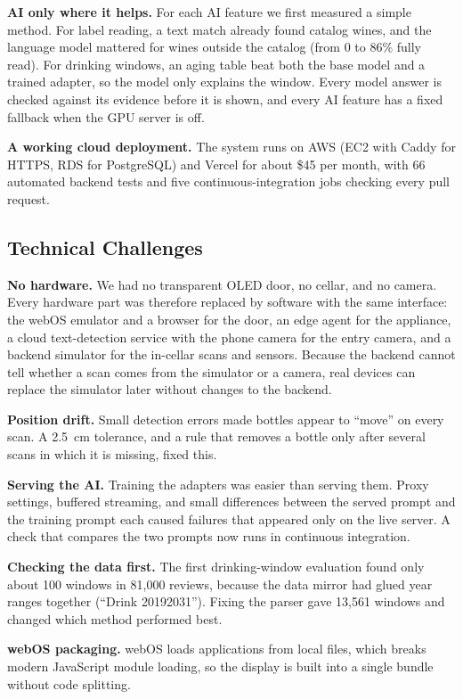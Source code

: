 \documentclass[conference]{IEEEtran}
\begin{document}
\textbf{AI only where it helps.} For each AI feature we first measured a simple method. For label reading, a text match already found catalog wines, and the language model mattered for wines outside the catalog (from 0 to 86\% fully read). For drinking windows, an aging table beat both the base model and a trained adapter, so the model only explains the window. Every model answer is checked against its evidence before it is shown, and every AI feature has a fixed fallback when the GPU server is off.

\textbf{A working cloud deployment.} The system runs on AWS (EC2 with Caddy for HTTPS, RDS for PostgreSQL) and Vercel for about \$45 per month, with 66 automated backend tests and five continuous-integration jobs checking every pull request.

\subsection{Technical Challenges}
\textbf{No hardware.} We had no transparent OLED door, no cellar, and no camera. Every hardware part was therefore replaced by software with the same interface: the webOS emulator and a browser for the door, an edge agent for the appliance, a cloud text-detection service with the phone camera for the entry camera, and a backend simulator for the in-cellar scans and sensors. Because the backend cannot tell whether a scan comes from the simulator or a camera, real devices can replace the simulator later without changes to the backend.

\textbf{Position drift.} Small detection errors made bottles appear to ``move'' on every scan. A 2.5~cm tolerance, and a rule that removes a bottle only after several scans in which it is missing, fixed this.

\textbf{Serving the AI.} Training the adapters was easier than serving them. Proxy settings, buffered streaming, and small differences between the served prompt and the training prompt each caused failures that appeared only on the live server. A check that compares the two prompts now runs in continuous integration.

\textbf{Checking the data first.} The first drinking-window evaluation found only about 100 windows in 81,000 reviews, because the data mirror had glued year ranges together (``Drink 20192031''). Fixing the parser gave 13,561 windows and changed which method performed best.

\textbf{webOS packaging.} webOS loads applications from local files, which breaks modern JavaScript module loading, so the display is built into a single bundle without code splitting.
\end{document}
